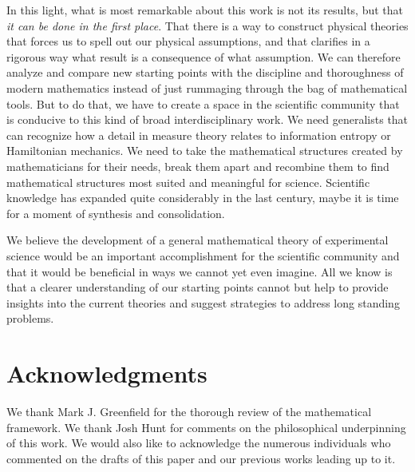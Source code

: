 \documentclass[letterpaper]{article}
\theoremstyle{plain}%
\theoremstyle{definition}
\theoremstyle{remark}
\numberwithin{equation}{section}
\begin{document}
In this light, what is most remarkable about this work is not its results, but that \emph{it can be done in the first place}. That there is a way to construct physical theories that forces us to spell out our physical assumptions, and that clarifies in a rigorous way what result is a consequence of what assumption. We can therefore analyze and compare new starting points with the discipline and thoroughness of modern mathematics instead of just rummaging through the bag of mathematical tools. But to do that, we have to create a space in the scientific community that is conducive to this kind of broad interdisciplinary work. We need generalists that can recognize how a detail in measure theory relates to information entropy or Hamiltonian mechanics. We need to take the mathematical structures created by mathematicians for their needs, break them apart and recombine them to find mathematical structures most suited and meaningful for science. Scientific knowledge has expanded quite considerably in the last century, maybe it is time for a moment of synthesis and consolidation.

We believe the development of a general mathematical theory of experimental science would be an important accomplishment for the scientific community and that it would be beneficial in ways we cannot yet even imagine. All we know is that a clearer understanding of our starting points cannot but help to provide insights into the current theories and suggest strategies to address long standing problems.

\section{Acknowledgments}

We thank Mark J. Greenfield for the thorough review of the mathematical framework. We thank Josh Hunt for comments on the philosophical underpinning of this work. We would also like to acknowledge the numerous individuals who commented on the drafts of this paper and our previous works leading up to it.


\end{document}
